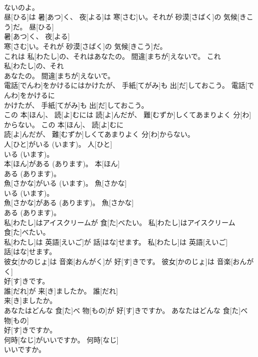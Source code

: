 \documentclass[8pt]{extreport}
\begin{document}
\begin{CJK}{UTF8}{min}
\\	ないのよ。	
\\	昼[ひる]は 暑[あつ]く、 夜[よる]は 寒[さむ]い。それが 砂漠[さばく]の 気候[きこう]だ。	昼[ひる]
\\	暑[あつ]く、 夜[よる]
\\	寒[さむ]い。それが 砂漠[さばく]の 気候[きこう]だ。	
\\	これは 私[わたし]の、それはあなたの。 間違[まちが]えないで。	これ
\\	私[わたし]の、それ
\\	あなたの。 間違[まちが]えないで。	
\\	電話[でんわ]をかけるにはかけたが、 手紙[てがみ]も 出[だ]しておこう。	電話[でんわ]をかけるに
\\	かけたが、 手紙[てがみ]も 出[だ]しておこう。	
\\	この 本[ほん]、 読[よ]むには 読[よ]んだが、 難[むずか]しくてあまりよく 分[わ]からない。	この 本[ほん]、 読[よ]むに
\\	読[よ]んだが、 難[むずか]しくてあまりよく 分[わ]からない。	
\\	人[ひと]がいる (います)。	人[ひと]
\\	いる (います)。	
\\	本[ほん]がある (あります)。	本[ほん]
\\	ある (あります)。	
\\	魚[さかな]がいる (います)。	魚[さかな]
\\	いる (います)。	
\\	魚[さかな]がある (あります)。	魚[さかな]
\\	ある (あります)。	
\\	私[わたし]はアイスクリームが 食[た]べたい。	私[わたし]はアイスクリーム
\\	食[た]べたい。	
\\	私[わたし]は 英語[えいご]が 話[はな]せます。	私[わたし]は 英語[えいご]
\\	話[はな]せます。	
\\	彼女[かのじょ]は 音楽[おんがく]が 好[す]きです。	彼女[かのじょ]は 音楽[おんがく]
\\	好[す]きです。	
\\	誰[だれ]が 来[き]ましたか。	誰[だれ]
\\	来[き]ましたか。	
\\	あなたはどんな 食[た]べ 物[もの]が 好[す]きですか。	あなたはどんな 食[た]べ 物[もの]
\\	好[す]きですか。	
\\	何時[なじ]がいいですか。	何時[なじ]
\\	いいですか。	

\end{CJK}
\end{document}
